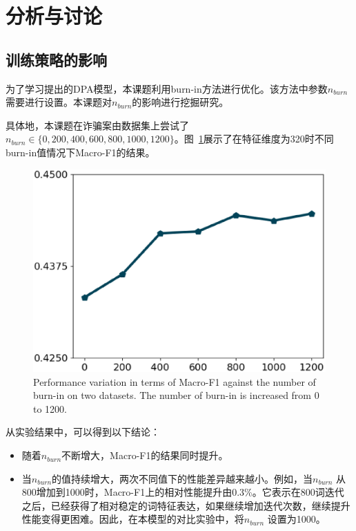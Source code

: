 \section{分析与讨论}
\label{sec:dpam_analysis}
\subsection{训练策略的影响}
为了学习提出的DPA模型，本课题利用burn-in方法进行优化。该方法中参数$n_{burn}$需要进行设置。本课题对$n_{burn}$的影响进行挖掘研究。

具体地，本课题在诈骗案由数据集上尝试了$n_{burn}\in \{0,200,400,600,800,1000,1200\}$。图~\ref{fig:comS}展示了在特征维度为320时不同burn-in值情况下Macro-F1的结果。
\begin{figure}[!t]%
\vspace{-10pt}
\centering
\includegraphics[scale=0.35, clip=true]{./sources/comS.eps}
\vspace{-20pt}
\caption{\label{fig:comS} Performance variation in terms of Macro-F1 against the number of burn-in on two datasets. The number of burn-in is increased from 0 to 1200.}
\vspace{-10pt}
\end{figure}

从实验结果中，可以得到以下结论：
\begin{itemize}
    \item 随着$n_{burn}$不断增大，Macro-F1的结果同时提升。
    \item 当$n_{burn}$的值持续增大，两次不同值下的性能差异越来越小。例如，当$n_{burn}$ 从800增加到1000时，Macro-F1上的相对性能提升由0.3\%。它表示在800词迭代之后，已经获得了相对稳定的词特征表达，如果继续增加迭代次数，继续提升性能变得更困难。因此，在本模型的对比实验中，将$n_{burn}$ 设置为1000。
\end{itemize}

